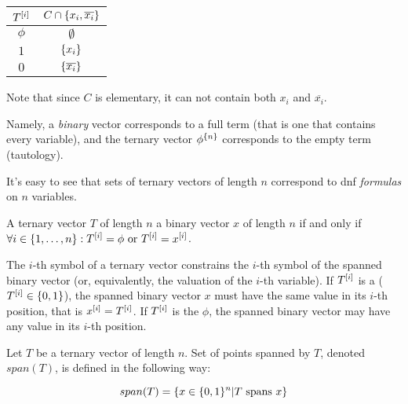 \begin{center}
\begin{tabular}{cc}
$T^{[i]}$ & $C \cap \{x_i, \overline{x_i}\}$ \\
\hline
$\phi$ & $\emptyset$ \\
$1$ & $\{x_i\}$ \\
$0$ & $\{\overline{x_i}\}$
\end{tabular}
\end{center}

Note that since $C$ is elementary,
it can not contain both $x_i$ and $\overline{x_i}$.

Namely,
a \emph{binary} vector corresponds to a full term
(that is one that contains every variable),
and the ternary vector $\phi^{\{n\}}$
corresponds to the empty term (tautology).

It's easy to see that sets of ternary vectors of length $n$
correspond to \acrshort{dnf} \emph{formulas}
on $n$ variables.

\begin{definition}[Spanning]
A ternary vector $T$ of length $n$ 
a binary vector $x$ of length $n$
if and only if
$\forall i \in \{1, \ldots, n\} : T^{[i]} = \phi \text{ or } T^{[i]} = x^{[i]}$.
\end{definition}

The $i$-th symbol of a ternary vector
constrains the $i$-th symbol of the spanned binary vector
(or, equivalently, the valuation of the $i$-th variable).
If $T^{[i]}$ is a 
($T^{[i]} \in \{0, 1\}$),
the spanned binary vector $x$
must have the same value
in its $i$-th position,
that is $x^{[i]} = T^{[i]}$.
If $T^{[i]}$ is the  $\phi$,
the spanned binary vector
may have any value in its $i$-th position.

\begin{definition}
Let $T$ be a ternary vector of length $n$.
Set of points spanned by $T$,
denoted $span(T)$,
is defined in the following way:

\begin{equation*}
span(T) = \{
x \in \{0, 1\}^n |
T\text{ spans }x
\}
\end{equation*}
\end{definition}

